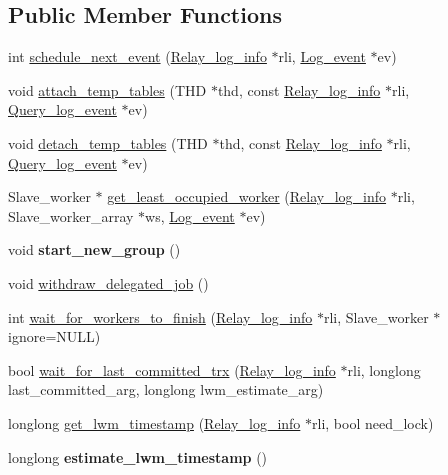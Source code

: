 \subsection*{Public Member Functions}
\begin{DoxyCompactItemize}
\item 
int \mbox{\hyperlink{classMts__submode__logical__clock_a7e2a78af961009a44eacddd88b0f517f}{schedule\+\_\+next\+\_\+event}} (\mbox{\hyperlink{classRelay__log__info}{Relay\+\_\+log\+\_\+info}} $\ast$rli, \mbox{\hyperlink{classLog__event}{Log\+\_\+event}} $\ast$ev)
\item 
void \mbox{\hyperlink{classMts__submode__logical__clock_a611d00eee05c4badebc630d80f0208fb}{attach\+\_\+temp\+\_\+tables}} (T\+HD $\ast$thd, const \mbox{\hyperlink{classRelay__log__info}{Relay\+\_\+log\+\_\+info}} $\ast$rli, \mbox{\hyperlink{classQuery__log__event}{Query\+\_\+log\+\_\+event}} $\ast$ev)
\item 
void \mbox{\hyperlink{classMts__submode__logical__clock_a0cff354bc8566687d40530c2cc430128}{detach\+\_\+temp\+\_\+tables}} (T\+HD $\ast$thd, const \mbox{\hyperlink{classRelay__log__info}{Relay\+\_\+log\+\_\+info}} $\ast$rli, \mbox{\hyperlink{classQuery__log__event}{Query\+\_\+log\+\_\+event}} $\ast$ev)
\item 
Slave\+\_\+worker $\ast$ \mbox{\hyperlink{classMts__submode__logical__clock_a2fcd334c4225b2cabdcd42a9e4179071}{get\+\_\+least\+\_\+occupied\+\_\+worker}} (\mbox{\hyperlink{classRelay__log__info}{Relay\+\_\+log\+\_\+info}} $\ast$rli, Slave\+\_\+worker\+\_\+array $\ast$ws, \mbox{\hyperlink{classLog__event}{Log\+\_\+event}} $\ast$ev)
\item 
\mbox{\label{classMts__submode__logical__clock_acb83dbd9dd69537395bfe08dc5b97bc6}} 
void {\bfseries start\+\_\+new\+\_\+group} ()
\item 
void \mbox{\hyperlink{classMts__submode__logical__clock_ab1f42bc5a3528849c24ffd45b8b25aca}{withdraw\+\_\+delegated\+\_\+job}} ()
\item 
int \mbox{\hyperlink{classMts__submode__logical__clock_ad7c1ed46ea9c55f1c4a40cda0c81aa41}{wait\+\_\+for\+\_\+workers\+\_\+to\+\_\+finish}} (\mbox{\hyperlink{classRelay__log__info}{Relay\+\_\+log\+\_\+info}} $\ast$rli, Slave\+\_\+worker $\ast$ignore=N\+U\+LL)
\item 
bool \mbox{\hyperlink{classMts__submode__logical__clock_a6f58da5b0597884a11feccf25f3cdc96}{wait\+\_\+for\+\_\+last\+\_\+committed\+\_\+trx}} (\mbox{\hyperlink{classRelay__log__info}{Relay\+\_\+log\+\_\+info}} $\ast$rli, longlong last\+\_\+committed\+\_\+arg, longlong lwm\+\_\+estimate\+\_\+arg)
\item 
longlong \mbox{\hyperlink{classMts__submode__logical__clock_ac91a392c2d94d6e6045f0ca8f1cbfa00}{get\+\_\+lwm\+\_\+timestamp}} (\mbox{\hyperlink{classRelay__log__info}{Relay\+\_\+log\+\_\+info}} $\ast$rli, bool need\+\_\+lock)
\item 
\mbox{\label{classMts__submode__logical__clock_a8b02848ef72e31334a02a3df9854680f}} 
longlong {\bfseries estimate\+\_\+lwm\+\_\+timestamp} ()
\end{DoxyCompactItemize}
